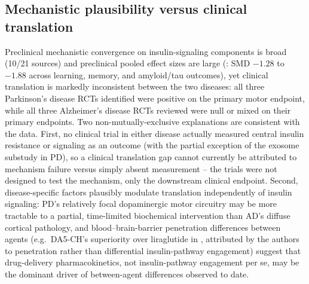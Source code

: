 \documentclass[11pt, a4paper]{article}
\begin{document}
\subsection{Mechanistic plausibility versus clinical translation}
Preclinical mechanistic convergence on insulin-signaling components is
broad (10/21 sources) and preclinical pooled effect sizes are large
(\citet{kong2023}: SMD $-1.28$ to $-1.88$ across learning, memory, and
amyloid/tau outcomes), yet clinical translation is markedly inconsistent
between the two diseases: all three Parkinson's disease RCTs identified
were positive on the primary motor endpoint, while all three Alzheimer's
disease RCTs reviewed were null or mixed on their primary endpoints. Two
non-mutually-exclusive explanations are consistent with the data. First, no
clinical trial in either disease actually measured central insulin
resistance or signaling as an outcome (with the partial exception of the
exosome substudy in PD), so a clinical translation gap cannot currently be
attributed to mechanism failure versus simply absent measurement -- the
trials were not designed to test the mechanism, only the downstream
clinical endpoint. Second, disease-specific factors plausibly modulate
translation independently of insulin signaling: PD's relatively focal
dopaminergic motor circuitry may be more tractable to a partial, time-limited
biochemical intervention than AD's diffuse cortical pathology, and
blood--brain-barrier penetration differences between agents (e.g.\ DA5-CH's
superiority over liraglutide in \citet{zhang2023}, attributed by the authors
to penetration rather than differential insulin-pathway engagement) suggest
that drug-delivery pharmacokinetics, not insulin-pathway engagement per se,
may be the dominant driver of between-agent differences observed to date.
\end{document}
